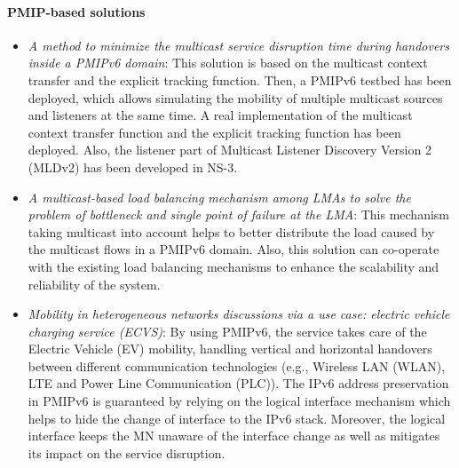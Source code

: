\paragraph{PMIP-based solutions}
\begin{itemize}
\item \textit{A method to minimize the multicast service disruption time during handovers inside a PMIPv6 domain}: This solution is based on the multicast context transfer and the explicit tracking function. Then, a PMIPv6 testbed has been deployed, which allows simulating the mobility of multiple multicast sources and listeners at the same time. A real implementation of the multicast context transfer function and the explicit tracking function has been deployed. Also, the listener part of Multicast Listener Discovery Version 2 (MLDv2) has been developed in NS-3.

\item \textit{A multicast-based load balancing mechanism among LMAs to solve the problem of bottleneck and single point of failure at the LMA}: This mechanism taking multicast into account helps to better distribute the load caused by the multicast flows in a PMIPv6 domain. Also, this solution can co-operate with the existing load balancing mechanisms to enhance the scalability and reliability of the system. 

\item \textit{Mobility in heterogeneous networks discussions via a use case: electric vehicle charging service (ECVS)}: By using PMIPv6, the service takes care of the Electric Vehicle (EV) mobility, handling vertical and horizontal handovers between different communication technologies (e.g., Wireless LAN (WLAN), LTE and Power Line Communication (PLC)). The IPv6 address preservation in PMIPv6 is guaranteed by relying on the logical interface mechanism which helps to hide the change of interface to the IPv6 stack. Moreover, the logical interface keeps the MN unaware of the interface change as well as mitigates its impact on the service disruption. 
\end{itemize}

